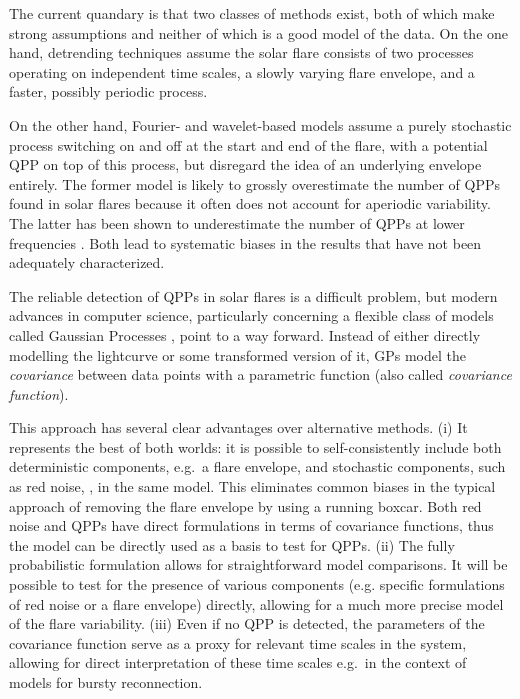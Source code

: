\documentclass{aastex61}
\begin{document}
The current quandary is that two classes of methods exist, both of which make strong assumptions and neither of which is a good model of the data. On the one hand, detrending techniques assume the solar flare consists of two processes operating on independent time scales, a slowly varying flare envelope, and a faster, possibly periodic process. 

On the other hand, Fourier- and wavelet-based models assume a purely stochastic process switching on and off at the start and end of the flare, with a potential QPP on top of this process, but disregard the idea of an underlying envelope entirely. 
The former model is likely to grossly overestimate the number of QPPs found in solar flares because it often does not account for aperiodic variability. The latter has been shown to underestimate the number of QPPs at lower frequencies \citep{huppenkothen2013}. 
Both lead to systematic biases in the results that have not been adequately characterized.

The reliable detection of QPPs in solar flares is a difficult problem, but modern advances in computer science, particularly concerning a flexible class of models called Gaussian Processes \citep[GPs;][]{rasmussen2006}, point to a way forward. Instead of either directly modelling the lightcurve or some transformed version of it, GPs model the \textit{covariance} between data points with a parametric function (also called \textit{covariance function}). 

This approach has several clear advantages over alternative methods. (i) It represents the best of both worlds: it is possible to self-consistently include both deterministic components, e.g.\ a flare envelope, and stochastic components, such as red noise, \citep{aigrain2015}, in the same model. This eliminates common biases in the typical approach of removing the flare envelope by using a running boxcar. %
Both red noise and QPPs have direct formulations in terms of covariance functions, thus the model can be directly used as a basis to test for QPPs. 
(ii) The fully probabilistic formulation allows for straightforward model comparisons. It will be possible to test for the presence of various components (e.g. specific formulations of red noise or a flare envelope) directly, allowing for a much more precise model of the flare variability.
(iii) Even if no QPP is detected, the parameters of the covariance function serve as a proxy for relevant time scales in the system, allowing for direct interpretation of these time scales e.g.\ in the context of models for bursty reconnection. 
\end{document}
